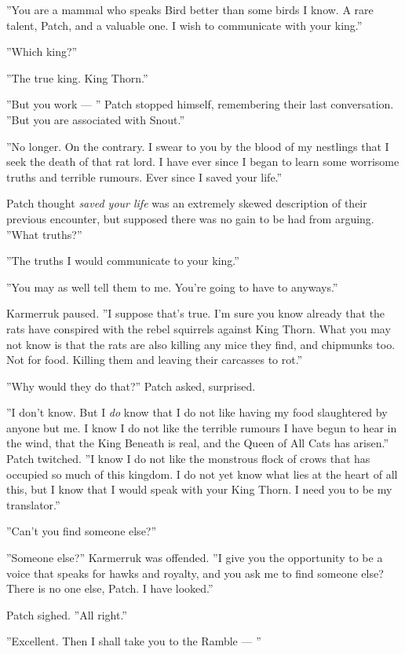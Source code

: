 \documentclass[12pt]{book}
\begin{document}
''You are a mammal who speaks Bird better than some birds I know. A rare talent, Patch, and a valuable one. I wish to communicate with your king.''

''Which king?''

''The true king. King Thorn.''

''But you work ---
'' Patch stopped himself, remembering their last conversation. ''But you are associated with Snout.''

''No longer. On the contrary. I swear to you by the blood of my nestlings that I seek the death of that rat lord. I have ever since I began to learn some worrisome truths and terrible rumours. Ever since I saved your life.''

Patch thought {\it saved your life} was an extremely skewed description of their previous encounter, but supposed there was no gain to be had from arguing. ''What truths?''

''The truths I would communicate to your king.''

''You may as well tell them to me. You're going to have to anyways.''

Karmerruk paused. ''I suppose that's true. I'm sure you know already that the rats have conspired with the rebel squirrels against King Thorn. What you may not know is that the rats are also killing any mice they find, and chipmunks too. Not for food. Killing them and leaving their carcasses to rot.''

''Why would they do that?'' Patch asked, surprised.

''I don't know. But I {\it do} know that I do not like having my food slaughtered by anyone but me. I know I do not like the terrible rumours I have begun to hear in the wind, that the King Beneath is real, and the Queen of All Cats has arisen.'' Patch twitched. ''I know I do not like the monstrous flock of crows that has occupied so much of this kingdom. I do not yet know what lies at the heart of all this, but I know that I would speak with your King Thorn. I need you to be my translator.''

''Can't you find someone else?''

''Someone else?'' Karmerruk was offended. ''I give you the opportunity to be a voice that speaks for hawks and royalty, and you ask me to find someone else? There is no one else, Patch. I have looked.''

Patch sighed. ''All right.''

''Excellent. Then I shall take you to the Ramble ---
''
\end{document}
